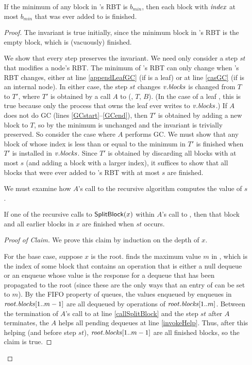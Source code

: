 \begin{invariant}\label{lem::finished}
If the minimum  of any block in 's RBT is $b_{min}$, then
each block with $\mbox{\textit{index}}$ at most $b_{min}$ that was ever added to  is finished.
\end{invariant}
\begin{proof}
The invariant is true initially, since the minimum  block in 's RBT is the empty block, which is (vacuously) finished.

We show that every step preserves the invariant.  
We need only consider a step $st$ that modifies a node's RBT.
The minimum  of 's RBT can only change when 's RBT changes, either at line 
\ref{appendLeafGC} (if  is a leaf) or at line \ref{casGC} (if  is an internal node).
In either case, the step $st$ changes $\mbox{\textnormal{\textit{v}}}.\mbox{\textit{blocks}}$ is changed
from $T$ to $T'$, where $T'$ is obtained by  a call $A$ to (, $T$, $B$).
(In the case of a leaf , this is true because only the process that owns the leaf ever
writes to $\mbox{\textnormal{\textit{v}}}.\mbox{\textit{blocks}}$.)
If $A$ does not do GC (lines \ref{GCstart}--\ref{GCend}), 
then $T'$ is obtained by adding a new block to $T$, so by  the minimum 
is unchanged and the invariant is trivially preserved.
So consider the case where $A$ performs GC.
We must show that any block of  whose index is less than or equal to the
minimum  in $T'$ is finished when $T'$ is installed in $\mbox{\textnormal{\textit{v}}}.\mbox{\textit{blocks}}$.
Since $T'$ is obtained by discarding all blocks with  at most $s$ (and adding
a block with a larger index), it suffices to show that all blocks that were ever added
to 's RBT with  at most $s$ are finished.

We must examine how $A$'s call to the recursive algorithm  computes the value of $s$.

\begin{claim}\label{splitfinished}
If one of the recursive calls to ${\sf SplitBlock}(x)$ within $A$'s call to ,
then that block and all earlier blocks in $x$ are finished when $st$ occurs.
\end{claim}
\begin{proof}[Proof of Claim]
We prove this claim  by induction on the depth of $x$.

For the base case, suppose $x$ is the root.
 finds the maximum value $m$ in , which is the index of some block
that contains an operation that is either a null dequeue or an enqueue whose value is the response for a dequeue that has been propagated to the root (since these are the only ways that an entry of  can be set to $m$).
By the FIFO property of queues, the values enqueued by enqueues in $\mbox{\textnormal{\textit{root}}}.\mbox{\textit{blocks}}[1..m-1]$
are all dequeued by operations of $\mbox{\textnormal{\textit{root}}}.\mbox{\textit{blocks}}[1..m]$.
Between the termination of $A$'s call to  at line \ref{callSplitBlock}
and the  step $st$ after $A$ terminates, the $A$ helps all pending dequeues at line \ref{invokeHelp}.
Thus, after this helping (and before step $st$),
$\mbox{\textnormal{\textit{root}}}.\mbox{\textit{blocks}}[1..m-1]$ are all finished blocks, so the claim is true.


\end{proof}
\end{proof}

